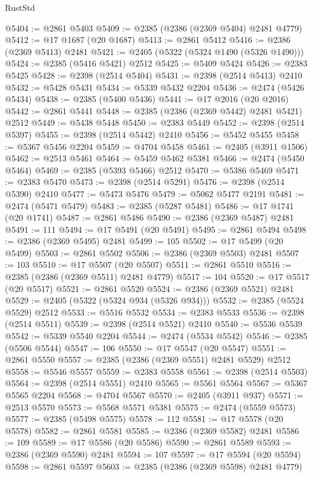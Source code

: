 \begin{lexlean}{RustStd}
\begin{coremodule}
@5404 := @2861 @5403
@5409 := @2385 (@2386 (@2369 @5404) @2481 @4779)
@5412 := @17 @1687 (@20 @1687)
@5413 := @2861 @5412
@5416 := @2386 (@2369 @5413) @2481
@5421 := @2405 (@5322 (@5324 @1490 (@5326 @1490)))
@5424 := @2385 (@5416 @5421) @2512
@5425 := @5409 @5424
@5426 := @2383 @5425
@5428 := @2398 (@2514 @5404)
@5431 := @2398 (@2514 @5413) @2410
@5432 := @5428 @5431
@5434 := @5339 @5432 @2204
@5436 := @2474 (@5426 @5434)
@5438 := @2385 (@5400 @5436)
@5441 := @17 @2016 (@20 @2016)
@5442 := @2861 @5441
@5448 := @2385 (@2386 (@2369 @5442) @2481 @5421) @2512
@5449 := @5438 @5448
@5450 := @2383 @5449
@5452 := @2398 (@2514 @5397)
@5455 := @2398 (@2514 @5442) @2410
@5456 := @5452 @5455
@5458 := @5367 @5456 @2204
@5459 := @4704 @5458
@5461 := @2405 (@3911 @1506)
@5462 := @2513 @5461
@5464 := @5459 @5462 @5381
@5466 := @2474 (@5450 @5464)
@5469 := @2385 (@5393 @5466) @2512
@5470 := @5386 @5469
@5471 := @2383 @5470
@5473 := @2398 (@2514 @5291)
@5476 := @2398 (@2514 @5390) @2410
@5477 := @5473 @5476
@5479 := @5062 @5477 @2191
@5481 := @2474 (@5471 @5479)
@5483 := @2385 (@5287 @5481)
@5486 := @17 @1741 (@20 @1741)
@5487 := @2861 @5486
@5490 := @2386 (@2369 @5487) @2481
@5491 := 111
@5494 := @17 @5491 (@20 @5491)
@5495 := @2861 @5494
@5498 := @2386 (@2369 @5495) @2481
@5499 := 105
@5502 := @17 @5499 (@20 @5499)
@5503 := @2861 @5502
@5506 := @2386 (@2369 @5503) @2481
@5507 := 103
@5510 := @17 @5507 (@20 @5507)
@5511 := @2861 @5510
@5516 := @2385 (@2386 (@2369 @5511) @2481 @4779)
@5517 := 104
@5520 := @17 @5517 (@20 @5517)
@5521 := @2861 @5520
@5524 := @2386 (@2369 @5521) @2481
@5529 := @2405 (@5322 (@5324 @934 (@5326 @934)))
@5532 := @2385 (@5524 @5529) @2512
@5533 := @5516 @5532
@5534 := @2383 @5533
@5536 := @2398 (@2514 @5511)
@5539 := @2398 (@2514 @5521) @2410
@5540 := @5536 @5539
@5542 := @5339 @5540 @2204
@5544 := @2474 (@5534 @5542)
@5546 := @2385 (@5506 @5544)
@5547 := 106
@5550 := @17 @5547 (@20 @5547)
@5551 := @2861 @5550
@5557 := @2385 (@2386 (@2369 @5551) @2481 @5529) @2512
@5558 := @5546 @5557
@5559 := @2383 @5558
@5561 := @2398 (@2514 @5503)
@5564 := @2398 (@2514 @5551) @2410
@5565 := @5561 @5564
@5567 := @5367 @5565 @2204
@5568 := @4704 @5567
@5570 := @2405 (@3911 @937)
@5571 := @2513 @5570
@5573 := @5568 @5571 @5381
@5575 := @2474 (@5559 @5573)
@5577 := @2385 (@5498 @5575)
@5578 := 112
@5581 := @17 @5578 (@20 @5578)
@5582 := @2861 @5581
@5585 := @2386 (@2369 @5582) @2481
@5586 := 109
@5589 := @17 @5586 (@20 @5586)
@5590 := @2861 @5589
@5593 := @2386 (@2369 @5590) @2481
@5594 := 107
@5597 := @17 @5594 (@20 @5594)
@5598 := @2861 @5597
@5603 := @2385 (@2386 (@2369 @5598) @2481 @4779)

\end{coremodule}
\end{lexlean}
